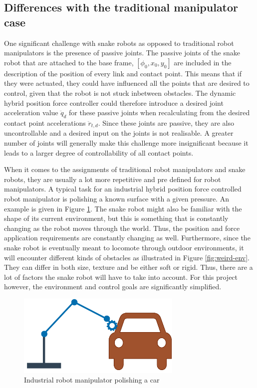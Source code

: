 \subsection{Differences with the traditional manipulator case}

One significant challenge with snake robots as opposed to traditional robot manipulators is the presence of passive joints. The passive joints of the snake robot that are attached to the base frame, $[\phi_0, x_0, y_0]$ are included in the description of the position of every link and contact point. This means that if they were actuated, they could have influenced all the points that are desired to control, given that the robot is not stuck inbetween obstacles. The dynamic hybrid position force controller could therefore introduce a desired joint acceleration value $\ddot{q}_d$ for these passive joints when recalculating from the desired contact point accelerations $\ddot{r}_{t,d}$. Since these joints are passive, they are also uncontrollable and a desired input on the joints is not realisable. A greater number of joints will generally make this challenge more insignificant because it leads to a larger degree of controllability of all contact points.

When it comes to the assignments of traditional robot manipulators and snake robots, they are usually a lot more repetitive and pre defined for robot manipulators. A typical task for an industrial hybrid position force controlled robot manipulator is polishing a known surface with a given pressure. An example is given in Figure \ref{fig:robotman-polish}. The snake robot might also be familiar with the shape of its current environment, but this is something that is constantly changing as the robot moves through the world. Thus, the position and force application requirements are constantly changing as well. Furthermore, since the snake robot is eventually meant to locomote through outdoor environments, it will encounter different kinds of obstacles as illustrated in Figure \ref{fig:weird-env}. They can differ in both size, texture and be either soft or rigid. Thus, there are a lot of factors the snake robot will have to take into account. For this project however, the environment and control goals are significantly simplified.

\begin{figure}
    \centering
    \includegraphics[width=0.7\textwidth]{figures/theory/robotman-polish.pdf}
    \caption{Industrial robot manipulator polishing a car}
    \label{fig:robotman-polish}
\end{figure}

